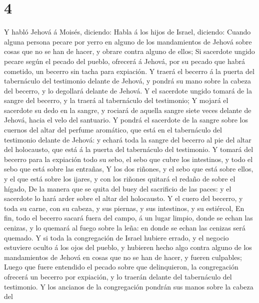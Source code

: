 \hypertarget{section-3}{%
\section{4}\label{section-3}}

 Y habló Jehová á Moisés, diciendo:  Habla á
los hijos de Israel, diciendo: Cuando alguna persona pecare por yerro en
alguno de los mandamientos de Jehová sobre cosas que no se han de hacer,
y obrare contra alguno de ellos;  Si sacerdote ungido
pecare según el pecado del pueblo, ofrecerá á Jehová, por su pecado que
habrá cometido, un becerro sin tacha para expiación.  Y
traerá el becerro á la puerta del tabernáculo del testimonio delante de
Jehová, y pondrá su mano sobre la cabeza del becerro, y lo degollará
delante de Jehová.  Y el sacerdote ungido tomará de la
sangre del becerro, y la traerá al tabernáculo del testimonio;
 Y mojará el sacerdote su dedo en la sangre, y rociará de
aquella sangre siete veces delante de Jehová, hacia el velo del
santuario.  Y pondrá el sacerdote de la sangre sobre los
cuernos del altar del perfume aromático, que está en el tabernáculo del
testimonio delante de Jehová: y echará toda la sangre del becerro al pie
del altar del holocausto, que está á la puerta del tabernáculo del
testimonio.  Y tomará del becerro para la expiación todo
su sebo, el sebo que cubre los intestinos, y todo el sebo que está sobre
las entrañas,  Y los dos riñones, y el sebo que está sobre
ellos, y el que está sobre los ijares, y con los riñones quitará el
redaño de sobre el hígado,  De la manera que se quita del
buey del sacrificio de las paces: y el sacerdote lo hará arder sobre el
altar del holocausto.  Y el cuero del becerro, y toda su
carne, con su cabeza, y sus piernas, y sus intestinos, y su estiércol,
 En fin, todo el becerro sacará fuera del campo, á un
lugar limpio, donde se echan las cenizas, y lo quemará al fuego sobre la
leña: en donde se echan las cenizas será quemado.  Y si
toda la congregación de Israel hubiere errado, y el negocio estuviere
oculto á los ojos del pueblo, y hubieren hecho algo contra alguno de los
mandamientos de Jehová en cosas que no se han de hacer, y fueren
culpables;  Luego que fuere entendido el pecado sobre que
delinquieron, la congregación ofrecerá un becerro por expiación, y lo
traerán delante del tabernáculo del testimonio.  Y los
ancianos de la congregación pondrán sus manos sobre la cabeza del
